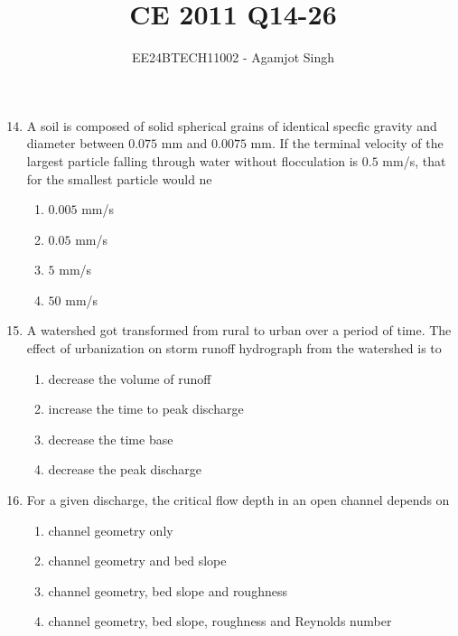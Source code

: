 \documentclass[journal,onecolumn]{IEEEtran}
\theoremstyle{remark}
\begin{document}

\vspace{3cm}

\title{CE 2011 Q14-26}
\author{EE24BTECH11002 - Agamjot Singh}
\maketitle

\renewcommand{\thefigure}{\theenumi}
\renewcommand{\thetable}{\theenumi}

\begin{enumerate}
    \setcounter{enumi}{13}

    \item A soil is composed of solid spherical grains of identical specfic gravity and diameter between $0.075$ mm and $0.0075$ mm. If the terminal velocity of the largest particle falling through water without flocculation is $0.5$ mm/s, that for the smallest particle would ne

	\begin{enumerate}
		\item $0.005$ mm/s
		\item $0.05$ mm/s
		\item $5$ mm/s
		\item $50$ mm/s
	\end{enumerate}

    \item A watershed got transformed from rural to urban over a period of time. The effect of urbanization on storm runoff hydrograph from the watershed is to

	\begin{enumerate}
		\item decrease the volume of runoff
		\item increase the time to peak discharge
		\item decrease the time base
		\item decrease the peak discharge
	\end{enumerate}

    \item For a given discharge, the critical flow depth in an open channel depends on

	\begin{enumerate}
		\item channel geometry only
		\item channel geometry and bed slope
		\item channel geometry, bed slope and roughness
		\item channel geometry, bed slope, roughness and Reynolds number
	\end{enumerate}



\end{enumerate}
\end{document}

